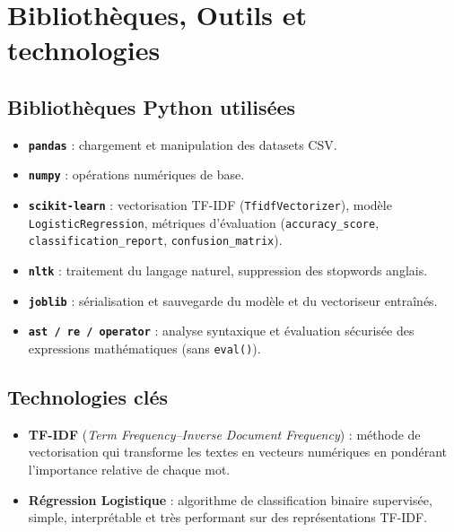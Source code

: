 \documentclass[a4paper, 12pt, twoside]{article}
\begin{document}
\section{Bibliothèques, Outils et technologies}

\subsection*{Bibliothèques Python utilisées}

\begin{itemize}
  \item \texttt{\textbf{pandas}} : chargement et manipulation des datasets CSV.
  \item \texttt{\textbf{numpy}} : opérations numériques de base.
  \item \texttt{\textbf{scikit-learn}} : vectorisation TF-IDF
        (\texttt{TfidfVectorizer}), modèle \texttt{LogisticRegression},
        métriques d'évaluation (\texttt{accuracy\_score},
        \texttt{classification\_report}, \texttt{confusion\_matrix}).
  \item \texttt{\textbf{nltk}} : traitement du langage naturel, suppression
        des stopwords anglais.
  \item \texttt{\textbf{joblib}} : sérialisation et sauvegarde du modèle
        et du vectoriseur entraînés.
  \item \texttt{\textbf{ast / re / operator}} : analyse syntaxique et
        évaluation sécurisée des expressions mathématiques (sans
        \texttt{eval()}).
\end{itemize}

\subsection*{Technologies clés}

\begin{itemize}
  \item \textbf{TF-IDF} (\textit{Term Frequency--Inverse Document Frequency}) :
        méthode de vectorisation qui transforme les textes en vecteurs
        numériques en pondérant l'importance relative de chaque mot.
  \item \textbf{Régression Logistique} : algorithme de classification binaire
        supervisée, simple, interprétable et très performant sur des
        représentations TF-IDF.
\end{itemize}
\end{document}
